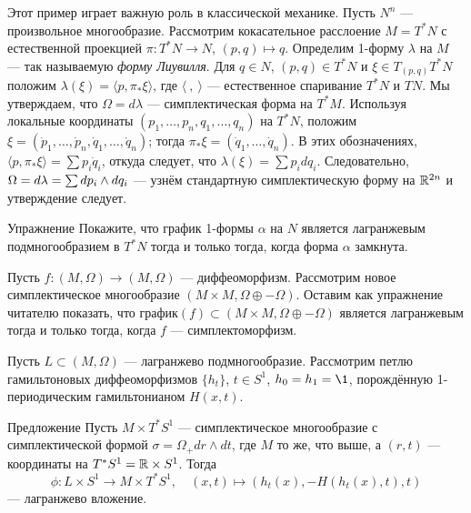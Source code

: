 Этот пример играет важную роль в классической механике.
Пусть $N^n$ --- произвольное многообразие.
Рассмотрим кокасательное расслоение $M = T^\ast N$ с естественной проекцией $\pi\colon T^\ast N \to N$, $(p, q) \mapsto q$.
Определим 1-форму $\lambda$ на $M$ --- так называемую \emph{форму Лиувилля}.
Для $q \in N$, $(p, q) \in T^\ast N$ и $\xi \in T_{(p, q)} T^\ast N$ положим $\lambda (\xi) = \langle p, \pi_\ast \xi \rangle$, где $\langle\ ,\ \rangle$ --- естественное спаривание $T^\ast N$ и $TN$.
Мы утверждаем, что $\Omega = d\lambda$ --- симплектическая форма на $T^\ast M$.
Используя локальные координаты $(p_1,\dots, p_n, q_1,\dots, q_n)$ на $T^\ast N$, положим $\xi = (\dot p_1 ,\dots, \dot p_n, \dot q_1,\dots,\dot q_n)$;
тогда $\pi_\ast \xi = (\dot q_1,\dots, \dot q_n)$.
В этих обозначениях, $\langle p, \pi_\ast \xi\rangle=\sum p_i \dot q_i$, откуда следует, что $\lambda (\xi) =\sum p_i dq_i$.
Следовательно, $\Omega = d\lambda =\sum dp_i \z\wedge dq_i$ --- узнём стандартную симплектическую форму на $\mathbb{R}^{2n}$ и утверждение следует.

\begin{thm*}{Упражнение}
Покажите, что график 1-формы $\alpha$ на $N$ является лагранжевым подмногообразием в $T^\ast N$ тогда и только тогда, когда форма $\alpha$ замкнута.
\end{thm*}

\begin{thm}{}\label{3.1.D}
\end{thm}

Пусть $f\colon (M, \Omega) \to (M, \Omega)$ --- диффеоморфизм.
Рассмотрим новое симплектическое многообразие $(M \times M, \Omega \oplus -\Omega)$.
Оставим как упражнение читателю показать, что график$(f) \subset (M \times M, \Omega \oplus -\Omega)$ является лагранжевым тогда и только тогда, когда $f$ --- симплектоморфизм.


\begin{thm}{}\label{3.1.E}
\end{thm}

Пусть $L \subset (M, \Omega)$ --- лагранжево подмногообразие.
Рассмотрим петлю гамильтоновых диффеоморфизмов $\{h_t\}$, $t \in S^1$, $h_0 = h_1 = \1$, порождённую 1-периодическим гамильтонианом $H (x, t)$.


\begin{thm*}{Предложение}
Пусть $M \times T^\ast S^1$ --- симплектическое многообразие с симплектической формой $\sigma = \Omega_+ dr \wedge dt$, где $M$ то же, что выше, а $(r, t)$ --- координаты на $T^\ast S^1 = \mathbb{R} \times S^1$.
Тогда
\[\phi\colon L \times S^1 \to M \times T^\ast S^1,
\quad
(x, t) \mapsto (h_t (x), -H (h_t (x), t), t)\]
--- лагранжево вложение.
\end{thm*}

